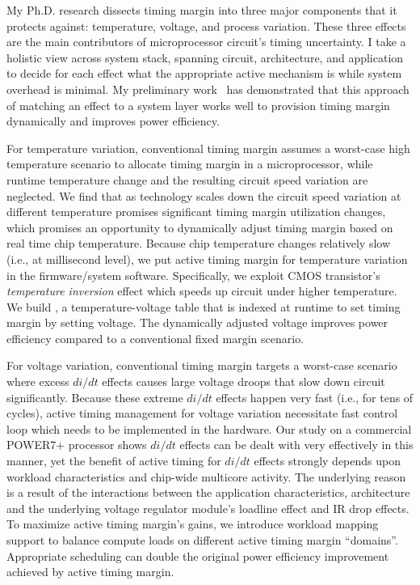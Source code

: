 My Ph.D. research dissects timing margin into three major components that it protects against: temperature, voltage, and process variation. These three effects are the main contributors of microprocessor circuit's timing uncertainty. I take a holistic view across system stack, spanning circuit, architecture, and application to decide for each effect what the appropriate active mechanism is while system overhead is minimal. My preliminary work~\cite{leng2015gpu,zu2015adaptive,zu2016tistate} has demonstrated that this approach of matching an effect to a system layer works well to provision timing margin dynamically and improves power efficiency.

For temperature variation, conventional timing margin assumes a worst-case high temperature scenario to allocate timing margin in a microprocessor, while runtime temperature change and the resulting circuit speed variation are neglected. We find that as technology scales down the circuit speed variation at different temperature promises significant timing margin utilization changes, which promises an opportunity to dynamically adjust timing margin based on real time chip temperature. Because chip temperature changes relatively slow (i.e., at millisecond level), we put active timing margin for temperature variation in the firmware/system software. Specifically, we exploit CMOS transistor's \textit{temperature inversion} effect which speeds up circuit under higher temperature. We build \tistates, a temperature-voltage table that is indexed at runtime to set timing margin by setting voltage. The dynamically adjusted voltage improves power efficiency compared to a conventional fixed margin scenario.

For voltage variation, conventional timing margin targets a worst-case scenario where excess $di/dt$ effects causes large voltage droops that slow down circuit significantly. Because these extreme $di/dt$ effects happen very fast (i.e., for tens of cycles), active timing management for voltage variation necessitate fast control loop which needs to be implemented in the hardware. Our study on a commercial POWER7+ processor shows $di/dt$ effects can be dealt with very effectively in this manner, yet the benefit of active timing for $di/dt$ effects strongly depends upon workload characteristics and chip-wide multicore activity. The underlying reason is a result of the interactions between the application characteristics, architecture and the underlying voltage regulator module's loadline effect and IR drop effects. To maximize active timing margin's gains, we introduce workload mapping support to balance compute loads on different active timing margin ``domains''. Appropriate scheduling can double the original power efficiency improvement achieved by active timing margin.

